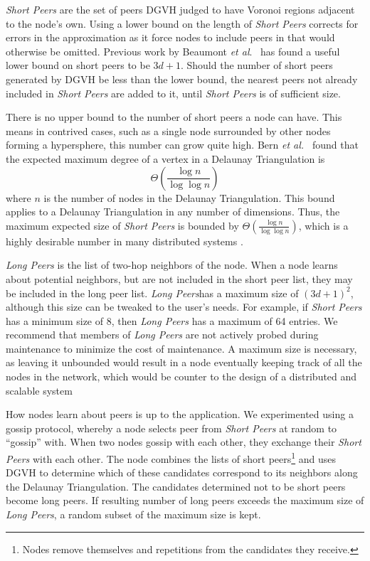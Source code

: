 \documentclass[11pt, conference, letterpaper]{IEEEtran}
\begin{document}
\textit{Short Peers} are the set of peers DGVH judged to have Voronoi regions adjacent to the node's own. 
Using a lower bound on the length of \textit{Short Peers} corrects for errors in the approximation as it force nodes to include peers in that would otherwise be omitted. 
Previous work by Beaumont \textit{et al}.\ \cite{raynet} has found a useful lower bound on short peers to be $3d + 1$.
Should the number of short peers generated by DGVH be less than the lower bound, the nearest peers not already included in \textit{Short Peers} are added to it, until \textit{Short Peers} is of sufficient size.



There is no upper bound to the number of short peers a node can have.
This means in contrived cases, such as a single node surrounded by other nodes forming a hypersphere, this number can grow quite high.
Bern \textit{et al.\ }\cite{bern1991expected} found that the expected maximum degree of a vertex in a Delaunay Triangulation is
$$\Theta(\frac{\log n}{\log \log n} )$$ 
where $n$ is the number of nodes in the Delaunay Triangulation. 
This bound applies to a Delaunay Triangulation in any number of dimensions.
Thus, the maximum expected size of \textit{Short Peers} is bounded by $\Theta(\frac{\log n}{\log \log n} )$, which is a highly desirable number in many distributed systems \cite{chord} \cite{kademlia}.



\textit{Long Peers} is the list of two-hop neighbors of the node.
When a node learns about potential neighbors, but are not included in the short peer list, they may be included in the long peer list.  
\textit{Long Peers}has a maximum size of $(3d+1)^2$, although this size can be tweaked to the user's needs.  
For example, if \textit{Short Peers} has a minimum size of 8, then \textit{Long Peers} has a maximum of 64 entries.  
We recommend that members of \textit{Long Peers} are not actively probed during maintenance to minimize the cost of maintenance.
A maximum size is necessary, as leaving it unbounded would result in a node eventually keeping track of all the nodes in the network, which would be counter to the design of a distributed and scalable system

How nodes learn about peers is up to the application.
We experimented using a gossip protocol, whereby a node selects peer from \textit{Short Peers} at random to ``gossip'' with.
When two nodes gossip with each other, they exchange their \textit{Short Peers} with each other.
The node combines the lists of short peers\footnote{Nodes remove themselves and repetitions from the candidates they receive.} and uses DGVH to determine which of these candidates correspond to its neighbors along the Delaunay Triangulation.
The candidates determined not to be short peers become long peers.  
If resulting number of long peers exceeds the maximum size of \textit{Long Peers}, a random subset of the maximum size is kept.
\end{document}
